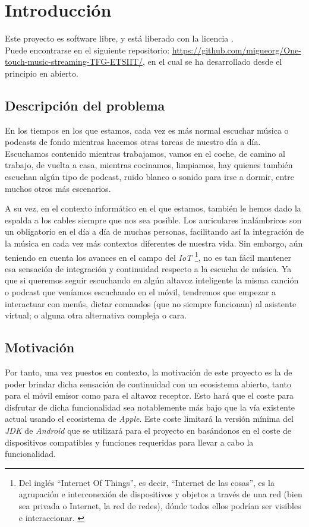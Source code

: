 \chapter{Introducción}

Este proyecto es software libre, y está liberado con la licencia \cite{gplv3}.\\

Puede encontrarse en el siguiente repositorio:
\url{https://github.com/migueorg/One-touch-music-streaming-TFG-ETSIIT/}, en el
cual se ha desarrollado desde el principio en abierto.

\section{Descripción del problema}
En los tiempos en los que estamos, cada vez es más normal escuchar música o
podcasts de fondo mientras hacemos otras tareas de nuestro día a día. Escuchamos
contenido mientras trabajamos, vamos en el coche, de camino al trabajo, de
vuelta a casa, mientras cocinamos, limpiamos, hay quienes también escuchan algún
tipo de podcast, ruido blanco o sonido para irse a dormir, entre muchos otros
más escenarios. 

A su vez, en el contexto informático en el que estamos, también le hemos dado la
espalda a los cables siempre que nos sea posible. Los auriculares inalámbricos
son un obligatorio en el día a día de muchas personas, facilitando así la
integración de la música en cada vez más contextos diferentes de nuestra vida.
Sin embargo, aún teniendo en cuenta los avances en el campo del \emph{IoT}
\footnote{Del inglés ``Internet Of Things'', es decir, ``Internet de las cosas'', es
la agrupación e interconexión de dispositivos y objetos a través de una red
(bien sea privada o Internet, la red de redes), dónde todos ellos podrían ser
visibles e interaccionar. \cite{IoT}}, no es tan fácil mantener esa sensación de
integración y continuidad respecto a la escucha de música. Ya que si queremos
seguir escuchando en algún altavoz inteligente la misma canción o podcast que
veníamos escuchando en el móvil, tendremos que empezar a interactuar con menús,
dictar comandos (que no siempre funcionan) al asistente virtual; o alguna otra
alternativa compleja o cara.\\

\section{Motivación}
Por tanto, una vez puestos en contexto, la motivación de este proyecto es la de
poder brindar dicha sensación de continuidad con un ecosistema abierto, tanto
para el móvil emisor como para el altavoz receptor. Esto hará que el coste para
disfrutar de dicha funcionalidad sea notablemente más bajo que la vía existente
actual usando el ecosistema de \emph{Apple}. Este coste limitará la versión
mínima del \emph{JDK} de \emph{Android} que se utilizará para el proyecto en
basándonos en el coste de dispositivos compatibles y funciones requeridas para
llevar a cabo la funcionalidad.


